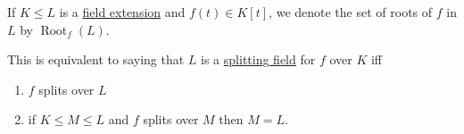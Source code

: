 \documentclass{article}
\DeclareMathOperator{\Root}{Root}
\begin{document}
\begin{notation}
    If $K \leq L$ is a \hyperlink{def:fieldExt}{field extension} and $f(t) \in K[t]$, we denote the set of roots of $f$ in $L$ by $\Root_f(L)$.
\end{notation}


\begin{remark}
    This is equivalent to saying that $L$ is a \hyperlink{def:splitting}{splitting field} for $f$ over $K$ iff
    \begin{enumerate}[label=(\roman*)]
        \item $f$ splits over $L$
        \item if $K \leq M \leq L$ and $f$ splits over $M$ then $M=L$.
    \end{enumerate}
\end{remark}
\end{document}
